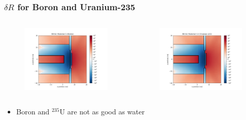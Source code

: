 \documentclass[t]{beamer}
\begin{document}
\begin{frame}
  \frametitle{$\delta R$ for Boron and Uranium-235}
  \vskip-0.3in
  \begin{columns}
    \begin{figure}
      \includegraphics[trim={0.7in 0.15in 1.05in 0.4in},clip,scale=0.36]{images/dR_05.png}
    \end{figure}
    \begin{figure}
      \includegraphics[trim={0.7in 0.15in 1.05in 0.4in},clip,scale=0.36]{images/dR_13.png}
    \end{figure}
  \end{columns}
  \begin{itemize}
    \item Boron and ${}^{235}\text{U}$ are not as good as water
  \end{itemize}
\end{frame}
\end{document}
